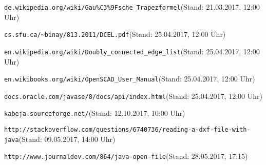 \begin{thebibliography}{9}
			\verb|de.wikipedia.org/wiki/Gau%C3%9Fsche_Trapezformel|(Stand: 21.03.2017, 12:00 Uhr)
		
		 \verb|cs.sfu.ca/~binay/813.2011/DCEL.pdf|(Stand: 25.04.2017, 12:00 Uhr)

		 \verb|en.wikipedia.org/wiki/Doubly_connected_edge_list|(Stand: 25.04.2017, 12:00 Uhr)
		
		 \verb|en.wikibooks.org/wiki/OpenSCAD_User_Manual|(Stand: 25.04.2017, 12:00 Uhr)
		
		 \verb|docs.oracle.com/javase/8/docs/api/index.html|(Stand: 25.04.2017, 12:00 Uhr)
		
		 \verb|kabeja.sourceforge.net/|(Stand: 12.10.2017, 10:00 Uhr)
		
		 \verb|http://stackoverflow.com/questions/6740736/reading-a-dxf-file-with-java|(Stand: 09.05.2017, 14:00 Uhr)
		
		 \verb|http://www.journaldev.com/864/java-open-file|(Stand: 28.05.2017, 17:15)
	
\end{thebibliography}